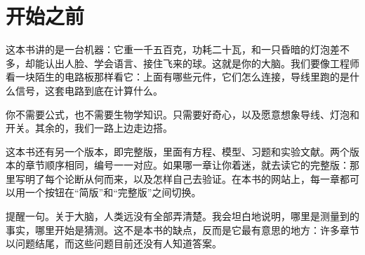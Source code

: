 \chapter*{开始之前}

这本书讲的是一台机器：它重一千五百克，功耗二十瓦，和一只昏暗的灯泡差不多，却能认出人脸、学会语言、接住飞来的球。这就是你的大脑。我们要像工程师看一块陌生的电路板那样看它：上面有哪些元件，它们怎么连接，导线里跑的是什么信号，这套电路到底在计算什么。

你不需要公式，也不需要生物学知识。只需要好奇心，以及愿意想象导线、灯泡和开关。其余的，我们一路上边走边搭。

这本书还有另一个版本，即完整版，里面有方程、模型、习题和实验文献。两个版本的章节顺序相同，编号一一对应。如果哪一章让你着迷，就去读它的完整版：那里写明了每个论断从何而来，以及怎样自己去验证。在本书的网站上，每一章都可以用一个按钮在“简版”和“完整版”之间切换。

提醒一句。关于大脑，人类远没有全部弄清楚。我会坦白地说明，哪里是测量到的事实，哪里开始是猜测。这不是本书的缺点，反而是它最有意思的地方：许多章节以问题结尾，而这些问题目前还没有人知道答案。
